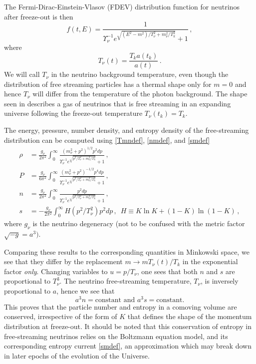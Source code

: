 The Fermi-Dirac-Einstein-Vlasov (FDEV) distribution function for neutrinos after freeze-out is then
\begin{equation}\label{neutrino_dist}
f(t,E)=\frac{1}{\Upsilon_\nu^{-1}e^{\sqrt{(E^2-m^2)/T_\nu^2+m_\nu^2 /T_k^2}}+ 1}\,,
\end{equation}
where 
\begin{equation}\label{Tneutrino_dist}
T_\nu(t)=\frac{T_ka(t_k)}{a(t)}\,. 
\end{equation}
We will call $T_\nu$ in  the neutrino background temperature, even though the distribution of free streaming particles has a thermal shape only for $m=0$ and hence $T_{\nu}$ will differ from the temperature of the photon background. The shape seen in   describes a gas of neutrinos that is free streaming in an expanding universe following the freeze-out temperature $T_\nu(t_k)=T_k$. 

The energy, pressure, number density, and entropy density of the free-streaming distribution can be computed using \eqref{Tmndef}, \eqref{nmdef}, and \eqref{smdef}
\begin{align}
\rho&=\frac{g_\nu}{2\pi^2}\!\int_0^\infty\!\!\!\frac{\left(m_\nu^2+p^2\right)^{1/2}p^2dp }{\Upsilon_\nu^{-1}e^{\sqrt{p^2/T_\nu^2+m_\nu^2/T_k^2}}+ 1}\,,\label{neutrino_rho}\\[0.2cm]
P&=\frac{g_\nu}{6\pi^2}\!\int_0^\infty\!\!\!\frac{\left(m_\nu^2+p^2\right)^{-1/2}p^4dp }{\Upsilon_\nu^{-1} e^{\sqrt{p^2/T_\nu^2+m_\nu^2/T_k^2}}+ 1}\,,\label{neutrino_P}\\[0.2cm]
n&=\frac{g_\nu}{2\pi^2}\!\int_0^\infty\!\!\!\frac{p^2dp }{\Upsilon_\nu^{-1}e^{\sqrt{p^2/T_\nu^2+m_\nu^2/T_k^2}}+ 1}\,,\label{num_density}\\[0.3cm]
s&=-\frac{g_\nu}{2\pi^2}\!\int_0^\infty\!\!\!H(p^2/T_\nu^2)p^2dp\,,\,\,\,H\equiv K\ln K +(1-K)\ln(1-K)\,,\label{entropy_integrand}
\end{align}
where $g_\nu$ is the neutrino degeneracy (not to be confused with the metric factor $\sqrt{-g}=a^3)$.

Comparing these results to the corresponding quantities in Minkowski space, we see that they differ by the replacement $m\rightarrow m T_\nu(t)/T_k$ in the exponential factor {\em only}. Changing variables to $u=p/T_\nu$, one sees that both $n$ and $s$ are proportional to $T_\nu^3$. The neutrino free-streaming temperature, $T_\nu$, is inversely proportional to $a$, hence we see that
\begin{equation}\label{const_entropy}
a^3n=\text{constant}\text{ and } a^3s=\text{constant}.
\end{equation}
This proves that the particle number and entropy in a comoving volume are conserved, irrespective of the form of $K$ that defines the shape of the momentum distribution at freeze-out. It should be noted that this conservation of entropy in free-streaming neutrinos relies on the Boltzmann equation model, and its corresponding entropy current \eqref{smdef}, an approximation which may break down in later epochs of the evolution of the Universe. 

